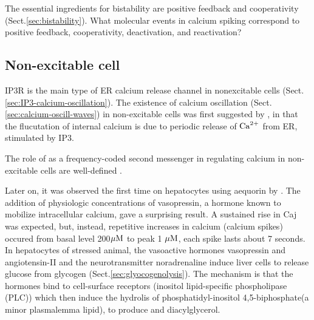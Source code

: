 The essential ingredients for bistability are positive feedback and
cooperativity (Sect.\ref{sec:bistability}). What molecular events in calcium
spiking correspond to positive feedback, cooperativity, deactivation, and
reactivation?

\subsection{Non-excitable cell}
\label{sec:calcium-oscillation-non-excitable-cell}

IP3R is the main type of ER calcium release channel in nonexcitable cells
(Sect.\ref{sec:IP3-calcium-oscillation}). The existence of calcium oscillation
(Sect.\ref{sec:calcium-oscill-waves}) in non-excitable cells was first suggested
by \citep{prince1973}, in that the flucutation of internal calcium is due to
periodic release of ${\text{Ca}^{2+}}$ from ER, stimulated by IP3.

The role of \IPthree as a frequency-coded second messenger in regulating calcium
in non-excitable cells are well-defined \citep{woods1986, thomas1996}. 

Later on, it was observed the first time on hepatocytes using aequorin by
\citep{woods1986, woods1987}.  The addition of physiologic concentrations of
vasopressin, a hormone known to mobilize intracellular calcium, gave a
surprising result. A sustained rise in Caj was expected, but, instead,
repetitive increases in calcium (calcium spikes) occured from basal level
200${\mu\text{M}}$ to peak 1 ${\mu\text{M}}$, each spike lasts about 7 seconds. In hepatocytes of
stressed animal, the vasoactive hormones vasopressin and angiotensin-II and the
neurotransmitter noradrenaline induce liver cells to release glucose from
glycogen (Sect.\ref{sec:glyocogenolysis}). The mechanism is that the hormones
bind to cell-surface receptors (inositol lipid-specific phospholipase (PLC))
which then induce the hydrolis of phosphatidyl-inositol 4,5-biphosphate(a minor
plasmalemma lipid), to produce \IPthree and diacylglycerol.

